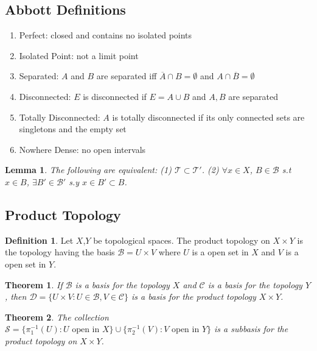 \documentclass[8pt,reqno,twocolumn]{amsart}
\newtheorem*{theorem*}{Theorem}
\newtheorem*{lemma}{Lemma}
\theoremstyle{definition}
\newtheorem*{definition}{Definition}
\renewcommand{\tt}{\mathcal{T}}
\newcommand{\bb}{\mathcal{B}}
\begin{document}
\subsection*{Abbott Definitions}
\begin{enumerate}
    \item Perfect: closed and contains no isolated points
    \item Isolated Point: not a limit point
    \item Separated: $A$ and $B$ are separated iff $\overline{A} \cap B = \emptyset$ and $A \cap \overline{B} = \emptyset$
    \item Disconnected: $E$ is disconnected if $E = A \cup B$ and $A, B$ are separated
    \item Totally Disconnected: $A$ is totally disconnected if its only connected sets are singletons and the empty set
    \item Nowhere Dense: no open intervals
\end{enumerate}
\begin{lemma}
 The following are equivalent: (1) $\tt \subset \tt'$. (2) $\forall x \in X$, $B \in \bb$ s.t $x \in B$, $\exists B' \in \bb'$ s.y $x \in B' \subset B$.
\end{lemma}
\subsection*{Product Topology}
\begin{definition}
    Let $X$,$Y$ be topological spaces. The product topology on $X \times Y$ is the topology having the basis $\bb = {U \times V}$ where $U$ is a open set in $X$ and $V$ is a open set in $Y$.
\end{definition}

\begin{theorem*}
    If $\bb$ is a basis for the topology $X$ and $\mathcal{C}$ is a basis for the topology $Y$, then $\mathcal{D} = \{U\times V: U \in \bb, V \in \mathcal{C}\}$ is a basis for the product topology $X \times Y$.
\end{theorem*}
\begin{theorem*}
    The collection $\mathcal{S} = \{\pi_1^{-1}(U): U\text{ open in $X$}\} \cup \{ \pi_2^{-1}(V): V \text{ open in $Y$}\}$ is a subbasis for the product topology on $X \times Y$.
\end{theorem*}
\end{document}
